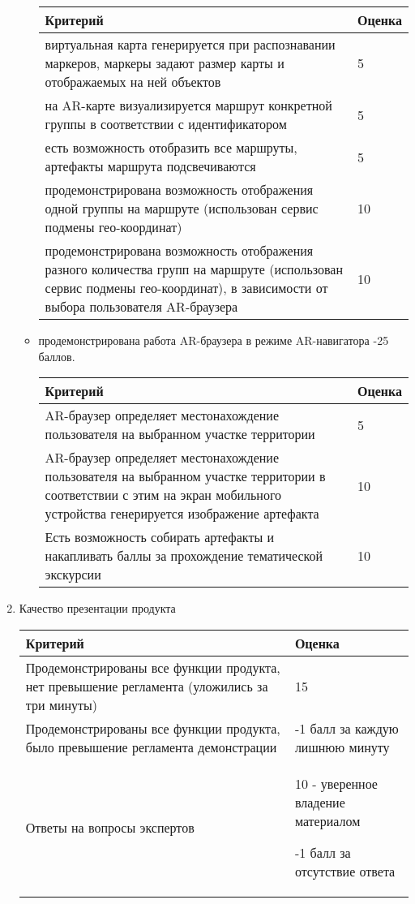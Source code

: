 \begin{enumerate}
\begin{itemize}
        \begin{tabular}{|p{7cm}|l|}
            \hline
            Критерий & Оценка \\
            \hline
            виртуальная карта генерируется при распознавании маркеров, маркеры задают размер карты и отображаемых на ней объектов & 5 \\
            \hline
            на AR-карте визуализируется маршрут конкретной группы в соответствии с идентификатором & 5 \\
            \hline
            есть возможность отобразить все маршруты, артефакты маршрута подсвечиваются & 5 \\
            \hline
            продемонстрирована возможность отображения одной группы на маршруте (использован сервис подмены гео-координат) & 10 \\
            \hline
            продемонстрирована возможность отображения разного количества групп на маршруте (использован сервис подмены гео-координат), в зависимости от выбора пользователя AR-браузера & 10 \\
            \hline
        \end{tabular}
        \item продемонстрирована работа AR-браузера в режиме AR-навигатора -25 баллов.
        
        \begin{tabular}{|p{7cm}|l|}
            \hline
            Критерий & Оценка \\
            \hline
            AR-браузер определяет местонахождение пользователя на выбранном участке территории & 5 \\
            \hline 
            AR-браузер определяет местонахождение пользователя на выбранном участке территории в соответствии с этим на экран мобильного устройства генерируется изображение артефакта & 10 \\
            \hline
            Есть возможность собирать артефакты и накапливать баллы за прохождение тематической экскурсии & 10 \\
            \hline
        \end{tabular}
    \end{itemize}
    \item Качество презентации продукта
    
    \begin{tabular}{|p{7cm}|p{4cm}|}
        \hline
        Критерий & Оценка \\
        \hline
        Продемонстрированы все функции продукта, нет превышение регламента (уложились за три минуты) & 15 \\
        \hline
        Продемонстрированы все функции продукта, было превышение регламента демонстрации & -1 балл за каждую лишнюю минуту \\
        \hline
        Ответы на вопросы экспертов & 10 - уверенное владение материалом
        
        -1 балл за отсутствие ответа \\
        \hline
    \end{tabular}
\end{enumerate}
    
    